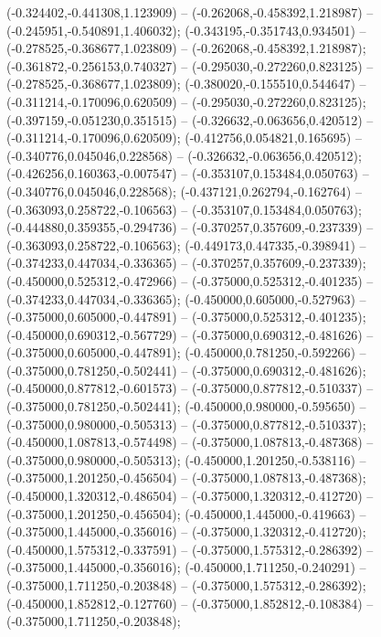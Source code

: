  (-0.324402,-0.441308,1.123909) -- (-0.262068,-0.458392,1.218987) -- (-0.245951,-0.540891,1.406032);
 (-0.343195,-0.351743,0.934501) -- (-0.278525,-0.368677,1.023809) -- (-0.262068,-0.458392,1.218987);
 (-0.361872,-0.256153,0.740327) -- (-0.295030,-0.272260,0.823125) -- (-0.278525,-0.368677,1.023809);
 (-0.380020,-0.155510,0.544647) -- (-0.311214,-0.170096,0.620509) -- (-0.295030,-0.272260,0.823125);
 (-0.397159,-0.051230,0.351515) -- (-0.326632,-0.063656,0.420512) -- (-0.311214,-0.170096,0.620509);
 (-0.412756,0.054821,0.165695) -- (-0.340776,0.045046,0.228568) -- (-0.326632,-0.063656,0.420512);
 (-0.426256,0.160363,-0.007547) -- (-0.353107,0.153484,0.050763) -- (-0.340776,0.045046,0.228568);
 (-0.437121,0.262794,-0.162764) -- (-0.363093,0.258722,-0.106563) -- (-0.353107,0.153484,0.050763);
 (-0.444880,0.359355,-0.294736) -- (-0.370257,0.357609,-0.237339) -- (-0.363093,0.258722,-0.106563);
 (-0.449173,0.447335,-0.398941) -- (-0.374233,0.447034,-0.336365) -- (-0.370257,0.357609,-0.237339);
 (-0.450000,0.525312,-0.472966) -- (-0.375000,0.525312,-0.401235) -- (-0.374233,0.447034,-0.336365);
 (-0.450000,0.605000,-0.527963) -- (-0.375000,0.605000,-0.447891) -- (-0.375000,0.525312,-0.401235);
 (-0.450000,0.690312,-0.567729) -- (-0.375000,0.690312,-0.481626) -- (-0.375000,0.605000,-0.447891);
 (-0.450000,0.781250,-0.592266) -- (-0.375000,0.781250,-0.502441) -- (-0.375000,0.690312,-0.481626);
 (-0.450000,0.877812,-0.601573) -- (-0.375000,0.877812,-0.510337) -- (-0.375000,0.781250,-0.502441);
 (-0.450000,0.980000,-0.595650) -- (-0.375000,0.980000,-0.505313) -- (-0.375000,0.877812,-0.510337);
 (-0.450000,1.087813,-0.574498) -- (-0.375000,1.087813,-0.487368) -- (-0.375000,0.980000,-0.505313);
 (-0.450000,1.201250,-0.538116) -- (-0.375000,1.201250,-0.456504) -- (-0.375000,1.087813,-0.487368);
 (-0.450000,1.320312,-0.486504) -- (-0.375000,1.320312,-0.412720) -- (-0.375000,1.201250,-0.456504);
 (-0.450000,1.445000,-0.419663) -- (-0.375000,1.445000,-0.356016) -- (-0.375000,1.320312,-0.412720);
 (-0.450000,1.575312,-0.337591) -- (-0.375000,1.575312,-0.286392) -- (-0.375000,1.445000,-0.356016);
 (-0.450000,1.711250,-0.240291) -- (-0.375000,1.711250,-0.203848) -- (-0.375000,1.575312,-0.286392);
 (-0.450000,1.852812,-0.127760) -- (-0.375000,1.852812,-0.108384) -- (-0.375000,1.711250,-0.203848);
